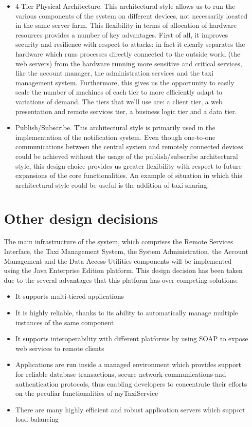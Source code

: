 \begin{itemize}
	\item 4-Tier Physical Architecture. This architectural style allows us to run the various components of the system on different devices, not necessarily located in the same server farm. This flexibility in terms of allocation of hardware resources provides a number of key advantages. First of all, it improves security and resilience with respect to attacks: in fact it clearly separates the hardware which runs processes directly connected to the outside world (the web servers) from the hardware running more sensitive and critical services, like the account manager, the administration services and the taxi management system. Furthermore, this gives us the opportunity to easily scale the number of machines of each tier to more efficiently adapt to variations of demand. The tiers that we'll use are: a client tier, a web presentation and remote services tier, a business logic tier and a data tier.
	\item Publish/Subscribe. This architectural style is primarily used in the implementation of the notification system. Even though one-to-one communications between the central system and remotely connected devices could be achieved without the usage of the publish/subscribe architectural style, this design choice provides us greater flexibility with respect to future expansions of the core functionalities. An example of situation in which this architectural style could be useful is the addition of taxi sharing.
\end{itemize}

\section{Other design decisions}
The main infrastructure of the system, which comprises the Remote Services Interface, the Taxi Management System, the System Administration, the Account Management and the Data Access Utilities components will be implemented using the Java Enterprise Edition platform. This design decision has been taken due to the several advantages that this platform has over competing solutions:
\begin{itemize}
	\item It supports multi-tiered applications
	\item It is highly reliable, thanks to its ability to automatically manage multiple instances of the same component
	\item It supports interoperability with different platforms by using SOAP to expose web services to remote clients 
	\item Applications are run inside a managed environment which provides support for reliable database transactions, secure network communications and authentication protocols, thus enabling developers to concentrate their efforts on the peculiar functionalities of myTaxiService
	\item There are many highly efficient and robust application servers which support load balancing
\end{itemize}

